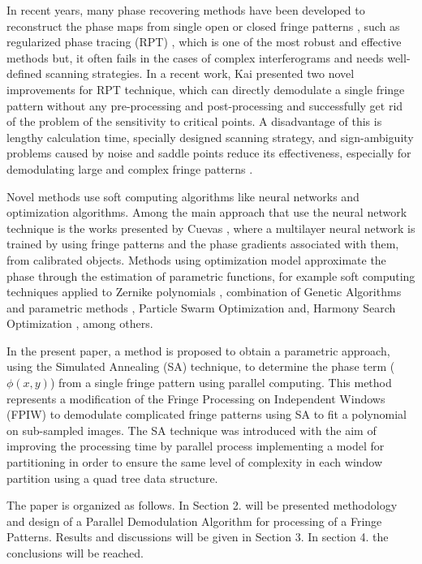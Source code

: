 \documentclass[review]{elsarticle}
\begin{document}
In recent years, many phase recovering methods have been developed to reconstruct the phase maps from single open or closed fringe patterns \cite{Servin:03,Robin:04,Robin:05,Rivera:05,Estrada:07,Kemao:07,Dalmau-Cedeno:08,Dong:16,Trusiak:16,Feng2019,Jin-Min2019,Munoz2019}, such as regularized phase tracing (RPT) \cite{Tian:10,Servin:97}, which is one of the most robust and effective methods but, it often fails in the cases  of complex interferograms and needs well-defined scanning strategies. In a recent work, Kai \cite{Kai:12} presented two novel improvements for RPT technique, which can directly demodulate a single fringe pattern without any pre-processing and post-processing and successfully get rid of the problem of the sensitivity to critical points. A disadvantage of this is lengthy calculation time, specially designed scanning strategy, and sign-ambiguity problems caused by noise and saddle points reduce its effectiveness, especially for demodulating large and complex fringe patterns \cite{He:17}.

Novel methods use soft computing algorithms like neural networks and optimization algorithms. Among the main approach that use the neural network technique is the works presented by Cuevas \cite{CUEVAS2000239,CUEVAS1999270}, where a multilayer neural network is trained by using fringe patterns and the phase gradients associated with them, from calibrated objects. Methods using optimization model  approximate the phase through the estimation of parametric functions, for example soft computing techniques applied to Zernike polynomials \cite{Espinosa2007a,Tian:11}, combination of Genetic Algorithms and parametric methods \cite{Cuevas2002,Cuevas2006a,Toledo2008}, Particle Swarm Optimization \cite{Jimenez2012} and, Harmony Search Optimization \cite{articleFDO}, among others.

In the present paper, a method is proposed to obtain a parametric approach, using the Simulated Annealing (SA) technique, to determine the phase term ($\phi(x,y)$) from a single fringe pattern using parallel computing. This method represents a modification of the Fringe Processing on Independent Windows (FPIW) \cite{Toledo2008} to demodulate complicated fringe patterns using SA  to fit a polynomial on sub-sampled images. The SA technique was introduced with the aim of improving the processing time by parallel process implementing a model for partitioning in order to ensure the same level of complexity in each window partition using a quad tree data structure.

The paper is organized as follows. In Section 2. will be presented methodology and design of a Parallel Demodulation Algorithm for processing of a Fringe Patterns. Results and discussions will be given in Section 3. In section 4. the conclusions will be reached.
\end{document}
